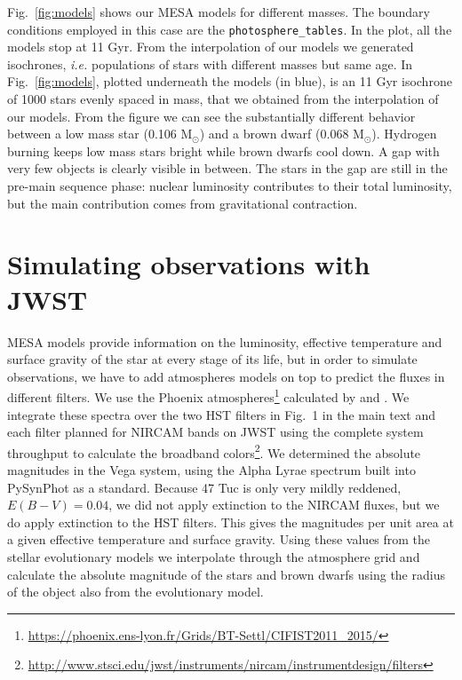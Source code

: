 \documentclass[useAMS,usenatbib]{mnras}
\begin{document}
Fig.~\ref{fig:models} shows our MESA models for different masses. The boundary conditions employed in this case are the \texttt{photosphere\_tables}. In the plot, all the models stop at 11 Gyr. From the interpolation of our models we generated isochrones, {\em i.e.} populations of stars with different masses but same age. In Fig.~\ref{fig:models}, plotted underneath the models (in blue), is an 11 Gyr isochrone of 1000 stars evenly spaced in mass, that we obtained from the interpolation of our models.  From the figure we can see the substantially different behavior between a low mass star (0.106 M$_\odot$) and a brown dwarf (0.068 M$_\odot$). Hydrogen burning keeps low mass stars bright while brown dwarfs cool down. A gap with very few objects is clearly visible in between. The stars in the gap are still in the pre-main sequence phase: nuclear luminosity contributes to their total luminosity, but the main contribution comes from gravitational contraction.

\section{Simulating observations with JWST}
\label{sec:simJWST}

MESA models provide information on the luminosity, effective temperature and surface gravity of the star at every stage of its life, but in order to simulate observations, we have to add atmospheres models on top to predict the fluxes in different filters. We use the Phoenix atmospheres\footnote{\url{https://phoenix.ens-lyon.fr/Grids/BT-Settl/CIFIST2011_2015/}} calculated by \citet{2015A&A...577A..42B} and \citet{2016Allard}. We integrate these spectra over the two HST filters in Fig.~1 in the main text and each filter planned for NIRCAM bands on JWST using the complete system throughput to calculate the broadband colors\footnote{\url{http://www.stsci.edu/jwst/instruments/nircam/instrumentdesign/filters}}.  We determined the absolute magnitudes in the Vega system, using the Alpha Lyrae spectrum built into PySynPhot as a standard.  Because 47 Tuc is only very mildly reddened, $E(B-V)=0.04$, we did not apply extinction to the NIRCAM fluxes, but we do apply extinction to the HST filters. This gives the magnitudes per unit area at a given effective temperature and surface gravity. Using these values from the stellar evolutionary models we interpolate through the atmosphere grid and calculate the absolute magnitude of the stars and brown dwarfs using the radius of the object also from the evolutionary model.
\end{document}

